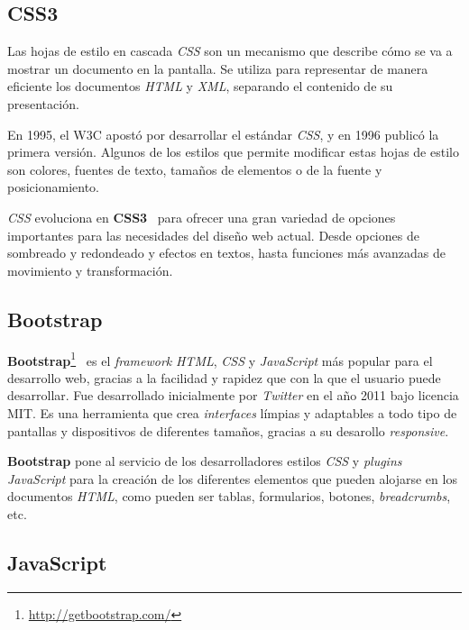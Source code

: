 \documentclass[a4paper, 12pt]{book}
\begin{document}
\subsection{CSS3} 
\label{subsec:css3}

Las hojas de estilo en cascada \textit{CSS} son un mecanismo que describe cómo se va a mostrar un documento en la pantalla. Se utiliza para representar de manera eficiente los documentos \textit{HTML} y \textit{XML}, separando el contenido de su presentación.
\newline

En 1995, el W3C apostó por desarrollar el estándar \textit{CSS}, y en 1996 publicó la primera versión. Algunos de los estilos que permite modificar estas hojas de estilo son colores, fuentes de texto, tamaños de elementos o de la fuente y posicionamiento.
\newline

\textit{CSS} evoluciona en \textbf{CSS3}~\cite{pagina-css3} para ofrecer una gran variedad de opciones importantes para las necesidades del diseño web actual. Desde opciones de sombreado y redondeado y efectos en textos, hasta funciones más avanzadas de movimiento y transformación. 


\subsection{Bootstrap} 
\label{subsec:bootstrap}

\textbf{Bootstrap}\footnote{\url{http://getbootstrap.com/}}~\cite{pagina-bootstrap} es el \textit{framework} \textit{HTML}, \textit{CSS} y \textit{JavaScript} más popular para el desarrollo web, gracias a la facilidad y rapidez que con la que el usuario puede desarrollar. Fue desarrollado inicialmente por \textit{Twitter} en el año 2011 bajo licencia MIT. Es una herramienta que crea \textit{interfaces} límpias y adaptables a todo tipo de pantallas y dispositivos de diferentes tamaños, gracias a su desarollo \textit{responsive}.
\newline

\textbf{Bootstrap} pone al servicio de los desarrolladores estilos \textit{CSS} y \textit{plugins} \textit{JavaScript} para la creación de los diferentes elementos que pueden alojarse en los documentos \textit{HTML}, como pueden ser tablas, formularios, botones, \textit{breadcrumbs}, etc.

\subsection{JavaScript} 
\label{subsec:javascript}
\end{document}
